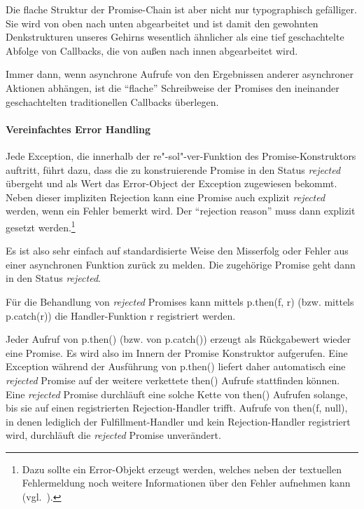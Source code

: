 \documentclass[
11pt, %
a4paper, %
oneside, %
pdfspacing, %
headinclude,
BCOR5mm, %
ngerman, %
bibtotocnumbered,
]{scrartcl}
\begin{document}
		Die flache Struktur der Promise-Chain ist aber nicht nur typographisch gefälliger. Sie wird von oben nach unten abgearbeitet und ist damit den gewohnten Denkstrukturen unseres Gehirns wesentlich ähnlicher als eine tief geschachtelte Abfolge von Callbacks, die von außen nach innen abgearbeitet wird.
		
		Immer dann, wenn asynchrone Aufrufe von den Ergebnissen anderer asynchroner Aktionen abhängen, ist die "`flache"' Schreibweise der Promises den ineinander geschachtelten traditionellen Callbacks überlegen.
		
		
		\paragraph{Vereinfachtes Error Handling}
		
		Jede Exception, die innerhalb der re"-sol"-ver-Funktion des Promise-Konstruktors auftritt, führt dazu, dass die zu konstruierende Promise in den Status \emph{rejected} übergeht und als Wert das Error-Object der Exception zugewiesen bekommt. Neben dieser impliziten Rejection kann eine Promise auch explizit \emph{rejected} werden, wenn ein Fehler bemerkt wird. Der "`rejection reason"' muss dann explizit gesetzt werden.\footnote{Dazu sollte ein Error-Objekt erzeugt werden, welches neben der textuellen Fehlermeldung noch weitere Informationen über den Fehler aufnehmen kann (vgl.~\citep[S.~22]{Parker.2015}).}  
		
		Es ist also sehr einfach auf standardisierte Weise den Misserfolg oder Fehler aus einer asynchronen Funktion zurück zu melden. Die zugehörige Promise geht dann in den Status \emph{rejected}.
		
		Für die Behandlung von \emph{rejected} Promises kann mittels \textsf{p.then(f, r)} (bzw. mittels \textsf{p.catch(r)}) die Handler-Funktion \textsf{r} registriert werden.
		
		Jeder Aufruf von \textsf{p.then()} (bzw. von \textsf{p.catch()}) erzeugt als Rückgabewert wieder eine Promise. Es wird also im Innern der Promise Konstruktor aufgerufen. Eine Exception während der Ausführung von \textsf{p.then()} liefert daher automatisch eine \emph{rejected} Promise auf der weitere verkettete \textsf{then()} Aufrufe stattfinden können. Eine \emph{rejected} Promise durchläuft eine solche Kette von \textsf{then()} Aufrufen solange, bis sie auf einen registrierten Rejection-Handler trifft. Aufrufe von \textsf{then(f, null)}, in denen lediglich der Fulfillment-Handler und kein Rejection-Handler registriert wird, durchläuft die \emph{rejected} Promise unverändert.
		
\end{document}
